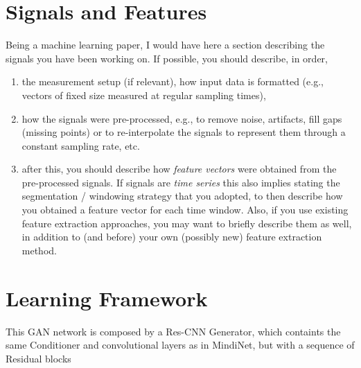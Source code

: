 \section{Signals and Features}
\label{sec:model}

Being a machine learning paper, I would have here a section describing the signals you have been working on. If possible, you should describe, in order, 
\begin{enumerate}
\item the measurement setup (if relevant), how input data is formatted (e.g., vectors of fixed size measured at regular sampling times), 
\item how the signals were \mbox{pre-processed}, e.g., to remove noise, artifacts, fill gaps (missing points) or to re-interpolate the signals to represent them through a constant sampling rate, etc.
\item after this, you should describe how {\it feature vectors} were obtained from the \mbox{pre-processed} signals. If signals are {\it time series} this also implies stating the segmentation / windowing strategy that you adopted, to then describe how you obtained a feature vector for each time window. Also, if you use existing feature extraction approaches, you may want to briefly describe them as well, in addition to (and before) your own (possibly new) feature extraction method.
\end{enumerate}


\section{Learning Framework}
\label{sec:learning_framework}

This GAN network is composed by a Res-CNN Generator, which containts the same Conditioner and convolutional layers as in MindiNet, but with a sequence of Residual blocks

